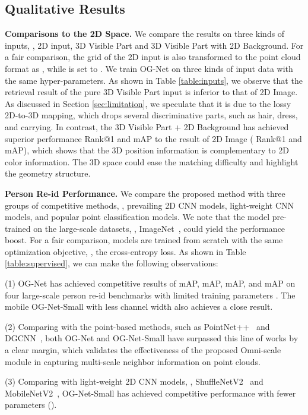 \subsection{Qualitative Results}

\textbf{Comparisons to the 2D Space.} We compare the results on three kinds of inputs, \ie, 2D input, 3D Visible Part and 3D Visible Part with 2D Background. For a fair comparison, the grid of the 2D input is also transformed to the point cloud format as , while  is set to . We train OG-Net on three kinds of input data with the same hyper-parameters. As shown in Table \ref{table:inputs}, we observe that the retrieval result of the pure 3D Visible Part input is inferior to that of 2D Image. As discussed in Section \ref{sec:limitation}, we speculate that it is  due to the lossy 2D-to-3D mapping, which drops several discriminative parts, such as hair, dress, and carrying. 
In contrast, the 3D Visible Part + 2D Background has achieved superior performance  Rank@1 and  mAP to the result of 2D Image ( Rank@1 and  mAP), which shows that the 3D position information is complementary to 2D color information. The 3D space could ease the matching difficulty and highlight the geometry structure. 

\textbf{Person Re-id Performance.}
We compare the proposed method with three groups of competitive methods, \ie, prevailing 2D CNN models, light-weight CNN models, and  popular point classification models. 
We note that the model pre-trained on the large-scale datasets, \eg, ImageNet~\cite{deng2009imagenet}, could yield the performance boost. For a fair comparison, models are trained from scratch with the same optimization objective, \ie, the cross-entropy loss. As shown in Table \ref{table:supervised}, we can make the following observations: 

(1) OG-Net has achieved competitive results of  mAP,  mAP,  mAP, and  mAP on four large-scale person re-id benchmarks with limited training parameters . The mobile OG-Net-Small with less channel width also achieves a close result. 

(2) Comparing with the point-based methods, such as PointNet++~\cite{qi2017pointnet++} and DGCNN~\cite{wang2019dynamic}, both OG-Net and OG-Net-Small have surpassed this line of works by a clear margin, which validates the effectiveness of the proposed Omni-scale module in capturing multi-scale neighbor information on point clouds. 

(3) Comparing with light-weight 2D CNN models, \ie, ShuffleNetV2~\cite{zhang2018shufflenet} and MobileNetV2~\cite{sandler2018mobilenetv2}, OG-Net-Small has achieved competitive performance with fewer parameters (). 

